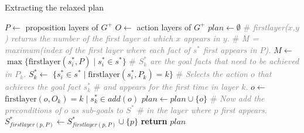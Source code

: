 \documentclass[ppgc,diss,english]{iiufrgs}
\begin{document}
\begin{algorithm}[tb]
\caption{Extracting the relaxed plan}
\label{alg:extracting-relaxed-plan}
\begin{algorithmic}[1]
  \State $P \gets$ proposition layers of $G^{+}$
  \State $O \gets$ action layers of $G^{+}$
  \State $plan \gets \emptyset$
  \State \textcolor{gray}{\# \emph{firstlayer($x$,$y$) returns the number of the first layer at which $x$ appears in $y$.}}
  \State \textcolor{gray}{\# \emph{M = maximum(index of the first layer where each fact of $s^{*}$ first appears in $P$).}}
  \State $M \gets$ $\max \{\text{firstlayer}(s_{i}^{*}, P) \mid s_{i}^{*} \in s^{*}\}$
    \State \textcolor{gray}{\# \emph{$S_{k}^{*}$ are the goal facts that need to be achieved in $P_{k}$.}}
    \State $S_{k}^{*} \gets$ $\{s_{i}^{*} \in s^{*} \mid \text{firstlayer}(s_{i}^{*}, P_{k}) = k\}$
  \EndFor
      \State \textcolor{gray}{\# \emph{Selects the action $o$ that achieves the goal fact $s_{k}^{*}$}}
      \State \textcolor{gray}{\# \emph{and appears for the first time in layer $k$}.}
      \State $o \gets$ $\text{firstlayer}(o, O_{k}) = k \mid s_{k}^{*} \in add(o)$
      \State $plan \gets plan \cup \{o\}$
      \State \textcolor{gray}{\# \emph{Now add the preconditions of $o$ as sub-goals to $S^{*}$}}
      \State \textcolor{gray}{\# \emph{in the layer where $p$ first appears}.}
        \State $S_{firstlayer(p, P)}^{*} \gets S_{firstlayer(p, P)}^{*} \cup \{p\}$
      \EndFor
    \EndFor
  \EndFor
  \State \textbf{return} $plan$
\EndProcedure
\end{algorithmic}
\end{algorithm}
\end{document}
